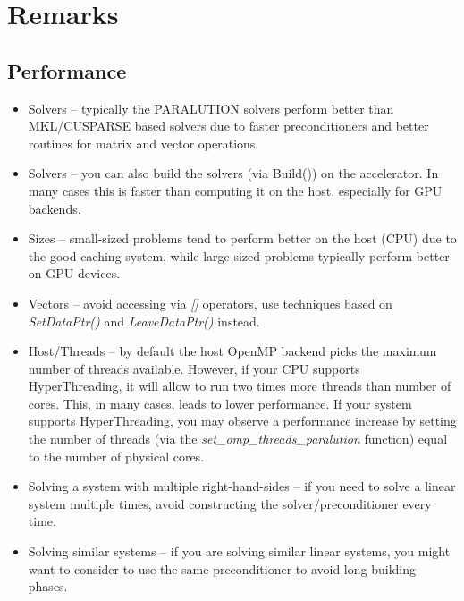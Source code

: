 \chapter{Remarks}

\section{Performance}
\label{remark-performance}

\begin{itemize}
\itemsep0em

\item Solvers -- typically the PARALUTION solvers perform better than MKL/CUSPARSE based solvers due to faster preconditioners and better routines for matrix and vector operations.

\item Solvers -- you can also build the solvers (via Build()) on the accelerator. In many cases this is faster than computing it on the host, especially for GPU backends.

\item Sizes -- small-sized problems tend to perform better on the host (CPU) due to the good caching system, while large-sized problems typically perform better on GPU devices.

\item Vectors -- avoid accessing via \emph{[]} operators, use techniques based on \emph{SetDataPtr()} and \emph{LeaveDataPtr()} instead.

\item Host/Threads -- by default the host OpenMP backend picks the maximum number of threads available. However, if your CPU supports HyperThreading, it will allow to run two times more threads than number of cores. This, in many cases, leads to lower performance. If your system supports HyperThreading, you may observe a performance increase by setting the number of threads (via the \emph{set\_omp\_threads\_paralution} function) equal to the number of physical cores.

\item Solving a system with multiple right-hand-sides -- if you need to solve a linear system multiple times, avoid constructing the solver/preconditioner every time.

\item Solving similar systems -- if you are solving similar linear systems, you might want to consider to use the same preconditioner to avoid long building phases.


\end{itemize}
